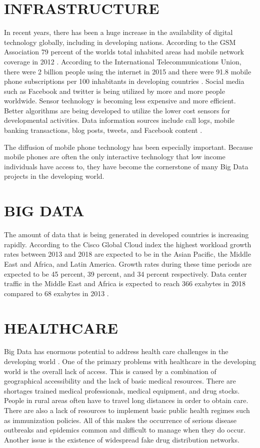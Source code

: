 \documentclass[sigconf]{acmart}
\begin{document}
\section{INFRASTRUCTURE}
In recent years, there has been a huge increase in the availability of digital technology globally, including in developing nations. According to the GSM Association 79 percent of the worlds total inhabited areas had mobile network coverage in 2012 \cite{DevEcon}. According to the International Telecommunications Union, there were 2 billion people using the internet in 2015 and there were 91.8 mobile phone subscriptions per 100 inhabitants in developing countries \cite{DevEcon}.  Social media such as Facebook and twitter is being utilized by more and more people worldwide. Sensor technology is becoming less expensive and more efficient. Better algorithms are being developed to utilize the lower cost sensors for developmental activities. Data information sources include call logs, mobile banking transactions, blog posts, tweets, and Facebook content \cite{www-google-GloPls}.

The diffusion of mobile phone technology has been especially important.  Because mobile phones are often the only interactive technology that low income individuals have access to, they have become the cornerstone of many Big Data projects in the developing world.

\section{BIG DATA}
The amount of data that is being generated in developed countries is increasing rapidly.  According to the Cisco Global Cloud index the highest workload growth rates between 2013 and 2018 are expected to be in the Asian Pacific, the Middle East and Africa, and Latin America.  Growth rates during these time periods are expected to be 45 percent, 39 percent, and 34 percent respectively.  Data center traffic in the Middle East and Africa is expected to reach 366 exabytes in 2018 compared to 68 exabytes in 2013 \cite{DevEcon}. 

\section{HEALTHCARE}

Big Data has enormous potential to address health care challenges in the developing world \cite{DevEcon}. One of the primary problems with healthcare in the developing world is the overall lack of access. This is caused by a combination of geographical accessibility and the lack of basic medical resources. There are shortages trained medical professionals, medical equipment, and drug stocks. People in rural areas often have to travel long distances in order to obtain care. There are also a lack of resources to implement basic public health regimes such as immunization policies.  All of this makes the occurrence of serious disease outbreaks and epidemics common and difficult to manage when they do occur.  Another issue is the existence of widespread fake drug distribution networks.
\end{document}
